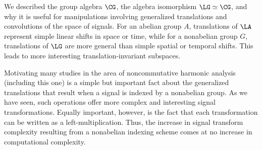 
We described the group algebra $\CG$,
the algebra isomorphism $\LG \simeq \CG$, and why it is
useful for manipulations involving generalized
translations and convolutions of the space of signals. 
For an abelian group $A$, translations of $\LA$
represent simple linear shifts in space or time, while for a nonabelian
group $G$, translations of $\LG$ are more general than
simple spatial or temporal shifts.  This leads to
more interesting translation-invariant subspaces.

Motivating many studies in the area of noncommutative
harmonic analysis (including this one) is a simple
but important fact about the generalized translations that
result when a signal is indexed by a nonabelian group.
As we have seen, such operations offer more complex and
interesting signal transformations.  Equally important,
however, is the fact that each transformation can be written
as a left-multiplication. Thus, the increase in signal transform
complexity resulting from a nonabelian indexing scheme
comes at no increase in computational complexity. 


